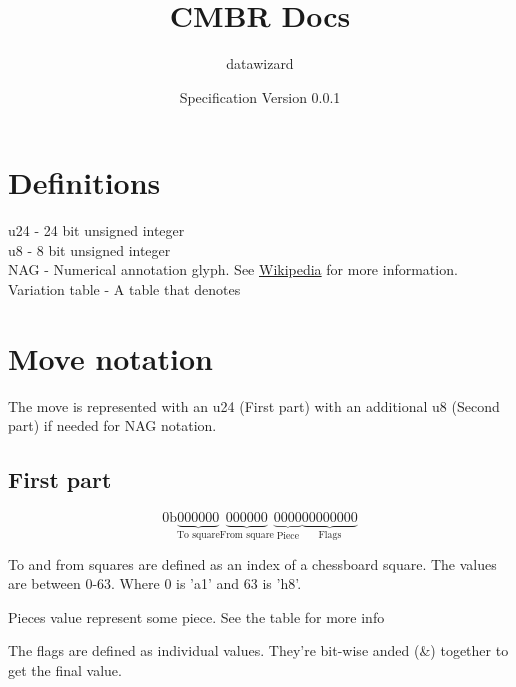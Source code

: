 \documentclass{article}
\title{CMBR Docs}
\author{datawizard}
\date{Specification Version 0.0.1}
\begin{document}
\maketitle

\section{Definitions}
u24 - 24 bit unsigned integer \\
u8  - 8  bit unsigned integer \\
NAG - Numerical annotation glyph. See \href{https://w.wiki/AWUT}{Wikipedia} for more information. \\
Variation table - A table that denotes  \\

\section{Move notation}
The move is represented with an u24 (First part) with an additional u8 (Second part) if needed for NAG notation.
\subsection{First part}
\begin{equation}
    0\text{b}\underbrace{000000}_\text{To square} \underbrace{000000}_\text{From square}
    \underbrace{0000}_\text{Piece}\underbrace{00000000}_\text{Flags}
\end{equation}

To and from squares are defined as an index of a chessboard square. The values are between 0-63. Where 0 is 'a1' and 63 is 'h8'.
\par Pieces value represent some piece. See the table for more info
\par The flags are defined as individual values. They're bit-wise anded (\&) together to get the final value.
\end{document}
